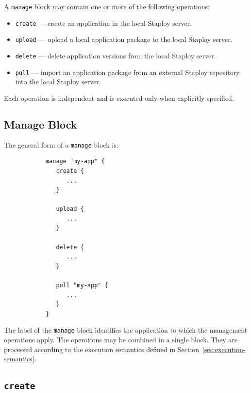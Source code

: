\documentclass[11pt,a4paper]{article}
\begin{document}
    A \texttt{manage} block may contain one or more of the following operations:

    \begin{itemize}
        \item \texttt{create} --- create an application in the local Staploy server.
        \item \texttt{upload} --- upload a local application package to the local Staploy server.
        \item \texttt{delete} --- delete application versions from the local Staploy server.
        \item \texttt{pull} --- import an application package from an external Staploy repository into the local Staploy server.
    \end{itemize}

    Each operation is independent and is executed only when explicitly specified.

    \subsection{Manage Block}\label{subsec:manage-block}

    The general form of a \texttt{manage} block is:

    \begin{center}
        \begin{verbatim}
            manage "my-app" {
               create {
                  ...
               }

               upload {
                  ...
               }

               delete {
                  ...
               }

               pull "my-app" {
                  ...
               }
            }
        \end{verbatim}
    \end{center}

    The label of the \texttt{manage} block identifies the application to which the management operations apply.
    The operations may be combined in a single block.
    They are processed according to the execution semantics defined in Section~\ref{sec:execution-semantics}.

    \subsection{\texttt{create}}\label{subsec:texttt}
\end{document}
